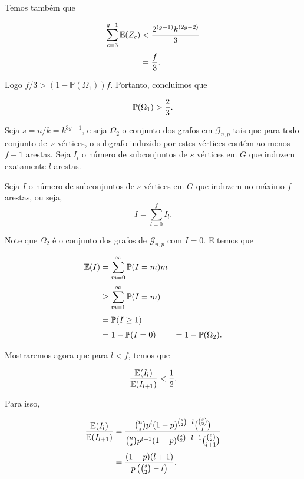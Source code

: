 Temos também que

\begin{equation*}
\setlength{\jot}{6pt}
\begin{aligned}
\sum\limits_{c=3}^{g-1}\bbe(Z_c) &< \frac{2^{(g-1)}k^{(2g-2)}}{3} \\
&= \frac{f}{3}.
\end{aligned}
\end{equation*}

Logo $f/3 > (1-\mathbb{P}(\Omega_1))f$. Portanto, concluímos que

\begin{equation}\label{teoerdosomega1}
\mathbb{P}(\Omega_1) > \frac{2}{3}.  
\end{equation}

Seja $s = n/k = k^{3g-1}$, e seja $\Omega_2$ o conjunto dos grafos em $\mathcal{G}_{n,p}$ tais que para todo conjunto de~$s$ vértices, o subgrafo induzido por estes vértices contém ao menos $f+1$ arestas. Seja $I_l$ o número de subconjuntos de $s$ vértices em $G$ que induzem exatamente $l$ arestas.

Seja $I$ o número de subconjuntos de $s$ vértices em $G$ que induzem no máximo $f$ arestas, ou seja, \[I = \sum\limits_{l=0}^{f}I_l.\]

Note que $\Omega_2$ é o conjunto dos grafos de $\mathcal{G}_{n,p}$ com $I = 0$. E temos que

\begin{equation*}
\setlength{\jot}{6pt}
\begin{aligned}
\bbe(I) &= \sum\limits_{m=0}^{\infty}\bbp(I = m)m \\
&\geq \sum\limits_{m=1}^{\infty}\bbp(I = m) \\
&= \bbp(I \geq 1) \\
&= 1 - \bbp(I = 0) &= 1 - \bbp(\Omega_2).
\end{aligned}
\end{equation*}

Mostraremos agora que para $l < f$, temos que

\[\frac{\mathbb{E}(I_l)}{\mathbb{E}(I_{l+1})} < \frac{1}{2}.\]

Para isso, 

\begin{equation*}
\setlength{\jot}{6pt}
\begin{aligned}
\frac{\bbe(I_l)}{\bbe(I_{l+1})} &= \frac{\binom{n}{s}p^l (1-p)^{\binom{s}{2}-l} \binom{\binom{s}{2}}{l}}{\binom{n}{s}p^{l+1} (1-p)^{\binom{s}{2}-l-1} \binom{\binom{s}{2}}{l+1}} \\
&= \frac{(1-p)(l+1)}{p\left(\binom{s}{2}-l\right)}.
\end{aligned}
\end{equation*}

